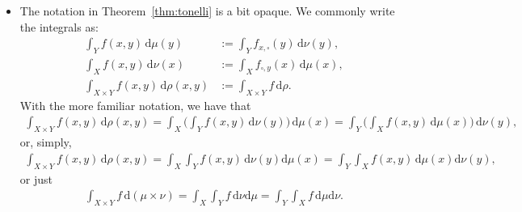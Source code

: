 \documentclass[10pt]{article}
\numberwithin{lemma}{section}
\newcommand{\dee}{\mathrm{d}}
\begin{document}
\begin{itemize}
  \item The notation in Theorem~\ref{thm:tonelli} is a bit opaque. We commonly write the integrals as:
  \begin{align*}
    \int_Y f(x,y)\, \dee \mu(y) &:= \int_Y f_{x,\square}(y)\, \dee\nu(y),\\
    \int_X f(x,y)\, \dee \nu(x) &:= \int_X f_{\square,y}(x)\, \dee\mu(x),\\
    \int_{X \times Y} f(x,y)\, \dee\rho(x,y)  &:= \int_{X \times Y} f\, \dee\rho.
  \end{align*} 
  With the more familiar notation, we have that
  \begin{align*}
    \int_{X \times Y} f(x,y)\, \dee\rho(x,y) = \int_X \bigg( \int_Y f(x,y)\, \dee\nu(y) \bigg)\, \dee\mu(x) = \int_Y \bigg( \int_X f(x,y)\, \dee\mu(x) \bigg)\, \dee\nu(y), 
  \end{align*}
  or, simply,
  \begin{align*}
    \int_{X \times Y} f(x,y)\, \dee\rho(x,y) = \int_X \int_Y f(x,y)\, \dee\nu(y)\dee\mu(x) = \int_Y \int_X f(x,y)\, \dee\mu(x) \dee\nu(y), 
  \end{align*}
  or just
  \begin{align*}
    \int_{X \times Y} f\, \dee(\mu \times \nu) = \int_X \int_Y f\, \dee\nu\dee\mu = \int_Y \int_X f\, \dee\mu \dee\nu. 
  \end{align*}


\end{itemize}
\end{document}

